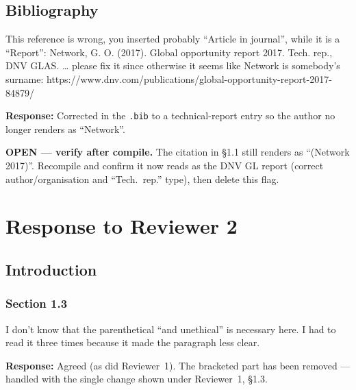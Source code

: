 \documentclass[11pt,a4paper]{article}
\begin{document}
\subsection*{Bibliography}

\begin{reviewbox}
This reference is wrong, you inserted probably ``Article in journal'', while it is a ``Report'': Network, G. O. (2017). Global opportunity report 2017. Tech. rep., DNV GLAS. \ldots{} please fix it since otherwise it seems like Network is somebody's surname: https://www.dnv.com/publications/global-opportunity-report-2017-84879/
\end{reviewbox}

\textbf{Response:} Corrected in the \texttt{.bib} to a technical-report entry so the author no longer renders as
``Network''.

\vspace{0.3cm}
\begin{flagbox}
\textbf{OPEN --- verify after compile.} The citation in §1.1 still renders as ``(Network 2017)''. Recompile and
confirm it now reads as the DNV GL report (correct author/organisation and ``Tech.\ rep.'' type), then delete
this flag.
\end{flagbox}

\section*{Response to Reviewer 2}

\subsection*{Introduction}

\subsubsection*{Section 1.3}

\begin{reviewbox}
I don't know that the parenthetical ``and unethical'' is necessary here. I had to read it three times because it made the paragraph less clear.
\end{reviewbox}

\textbf{Response:} Agreed (as did Reviewer~1). The bracketed part has been removed --- handled with the single
change shown under Reviewer~1, §1.3.
\end{document}
